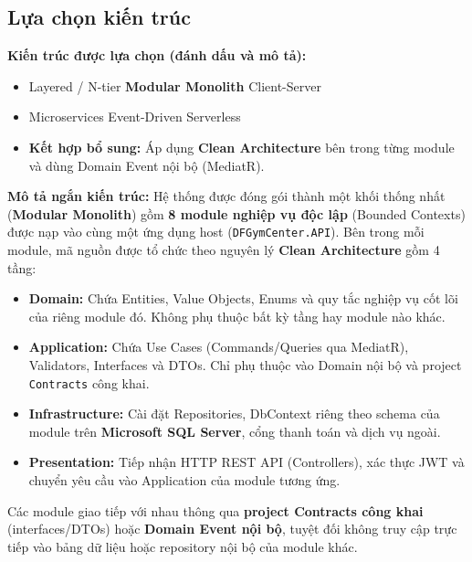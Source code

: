 \documentclass[a4paper,12pt]{article}
\begin{document}
\subsection{Lựa chọn kiến trúc}
\textbf{Kiến trúc được lựa chọn (đánh dấu và mô tả):}
\begin{itemize}
    \item [$\square$] Layered / N-tier \qquad [$\boxtimes$] \textbf{Modular Monolith} \qquad [$\square$] Client-Server
    \item [$\square$] Microservices \qquad [$\square$] Event-Driven \qquad [$\square$] Serverless
    \item [$\boxtimes$] \textbf{Kết hợp bổ sung:} Áp dụng \textbf{Clean Architecture} bên trong từng module và dùng Domain Event nội bộ (MediatR).
\end{itemize}

\textbf{Mô tả ngắn kiến trúc:}
Hệ thống được đóng gói thành một khối thống nhất (\textbf{Modular Monolith}) gồm \textbf{8 module nghiệp vụ độc lập} (Bounded Contexts) được nạp vào cùng một ứng dụng host (\texttt{DFGymCenter.API}). Bên trong mỗi module, mã nguồn được tổ chức theo nguyên lý \textbf{Clean Architecture} gồm 4 tầng:
\begin{itemize}
    \item \textbf{Domain:} Chứa Entities, Value Objects, Enums và quy tắc nghiệp vụ cốt lõi của riêng module đó. Không phụ thuộc bất kỳ tầng hay module nào khác.
    \item \textbf{Application:} Chứa Use Cases (Commands/Queries qua MediatR), Validators, Interfaces và DTOs. Chỉ phụ thuộc vào Domain nội bộ và project \texttt{Contracts} công khai.
    \item \textbf{Infrastructure:} Cài đặt Repositories, DbContext riêng theo schema của module trên \textbf{Microsoft SQL Server}, cổng thanh toán và dịch vụ ngoài.
    \item \textbf{Presentation:} Tiếp nhận HTTP REST API (Controllers), xác thực JWT và chuyển yêu cầu vào Application của module tương ứng.
\end{itemize}
Các module giao tiếp với nhau thông qua \textbf{project Contracts công khai} (interfaces/DTOs) hoặc \textbf{Domain Event nội bộ}, tuyệt đối không truy cập trực tiếp vào bảng dữ liệu hoặc repository nội bộ của module khác.
\end{document}
